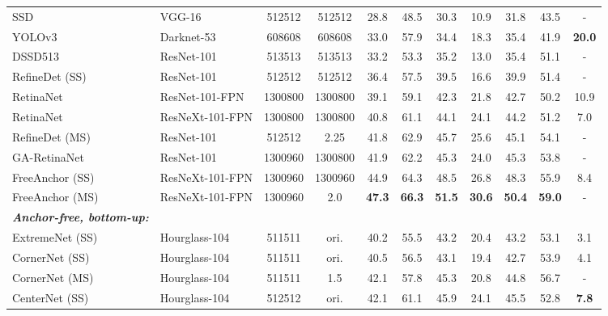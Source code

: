 \documentclass{bmvc2k}
\begin{document}
\begin{table}[H]
{\begin{tabular}{llccccccccc}
SSD~\cite{ssd}         & VGG-16                 &  512512 & 512512 & 28.8 & 48.5 & 30.3 & 10.9 & 31.8 & 43.5         & -\\
YOLOv3~\cite{yolo3}        & Darknet-53                  &  608608 & 608608& 33.0 & 57.9 &  34.4 & 18.3 &  35.4 & 41.9 & \textbf{20.0}\\
DSSD513~\cite{dssd} & ResNet-101         &   513513 & 513513& 33.2& 53.3 & 35.2 & 13.0 & 35.4 &51.1        & - \\ 
RefineDet (SS)~\cite{refinedet} & ResNet-101 &  512512 & 512512&  36.4 & 57.5 & 39.5 & 16.6 & 39.9 & 51.4 & - \\
RetinaNet~\cite{retinanet} & ResNet-101-FPN &  1300800 & 1300800 & 39.1 & 59.1 & 42.3 & 21.8 & 42.7 & 50.2 & 10.9 \\
RetinaNet~\cite{retinanet} & ResNeXt-101-FPN &  1300800 & 1300800 & 40.8 & 61.1 & 44.1 & 24.1 & 44.2 & 51.2 & 7.0 \\
RefineDet (MS)~\cite{refinedet} & ResNet-101 &  512512 & 2.25 & 41.8 & 62.9 & 45.7 &  25.6 & 45.1 & 54.1 & - \\
GA-RetinaNet~\cite{guided}& ResNet-101 &  1300960 & 1300800 & 41.9 & 62.2 & 45.3 & 24.0 & 45.3 & 53.8 & - \\
FreeAnchor (SS)~\cite{freeanchor} & ResNeXt-101-FPN &   1300960 & 1300960 & 44.9 & 64.3 & 48.5 & 26.8 & 48.3 & 55.9 & 8.4 \\
FreeAnchor (MS)~\cite{freeanchor} & ResNeXt-101-FPN &  1300960 & 2.0 & \textbf{47.3} &   \textbf{66.3} &  \textbf{51.5} &   \textbf{30.6} & \textbf{50.4} &  \textbf{59.0} & - \\
\midrule 





\textbf{\textit{Anchor-free, bottom-up:}} & & & & & & & & & & \\


ExtremeNet (SS)~\cite{extremenet} & Hourglass-104 &   511511 & ori. & 40.2 & 55.5 & 43.2 & 20.4 & 43.2 & 53.1  & 3.1 \\
CornerNet (SS)~\cite{cornernet} & Hourglass-104 & 511511 & ori.& 40.5 & 56.5 & 43.1 & 19.4 & 42.7 & 53.9 & 4.1 \\
CornerNet  (MS)~\cite{cornernet}& Hourglass-104 &  511511 & 1.5 & 42.1 & 57.8 & 45.3 & 20.8 & 44.8 & 56.7 & - \\
CenterNet (SS)~\cite{centernet} & Hourglass-104 &   512512 & ori. & 42.1 & 61.1 & 45.9 &  24.1 & 45.5 & 52.8 & \textbf{7.8} \\



\end{tabular}}
\end{table}
\end{document}
